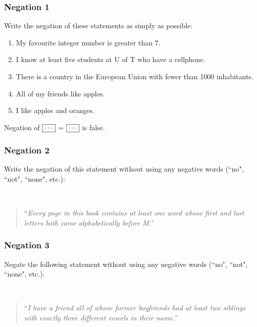 \documentclass[14pt]{beamer}
\newcommand {\DS} [1] {${\displaystyle #1}$}
\newcommand{\azul}[1]{{\color{blue} #1}}
\newcommand{\majab}[1]{\boxed{\azul{ #1}}}
\begin{document}
\begin{frame} \frametitle{Negation 1}

Write the negation of these statements as simply as possible:

	\begin{enumerate}
		\item  My favourite integer number is greater than $7$.
		\item  I know at least five students at U of T who have a cellphone.
		\item  There is a country in the European Union with fewer than 1000 inhabitants.
		\item  All of my friends like apples.
		\item  I like apples and oranges.
	\end{enumerate}	
	
\vfill

	\begin{center}
		
		Negation of  \DS{\majab{\cdots}} \; = \; \DS{\majab{\cdots}} is false. 
	
	\end{center}	
\end{frame}

\begin{frame}
\frametitle{Negation 2}

Write the negation of this statement without using any negative words (``no", ``not", ``none", etc.): 

\

	\begin{quote}
		``\emph{Every page in this book contains at least one word whose first and last letters both come alphabetically before M.}''
	\end{quote}
\end{frame}


\begin{frame}
\frametitle{Negation 3}

Negate the following statement without using any negative words (``no", ``not", ``none", etc.): 

\

	\begin{quote}
		``\emph{I have a friend all of whose former boyfriends had at least two siblings 
	    with exactly three different vowels in their name.}''
	\end{quote}
\end{frame}
\end{document}
